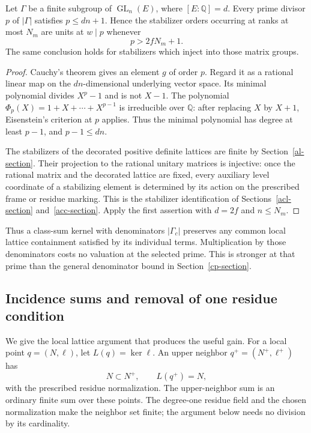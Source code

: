 \begin{lemma}\label{cv-stabilizer-unit}
Let $\Gamma$ be a finite subgroup of $\operatorname{GL}_n(E)$, where
$[E:\mathbb Q]=d$.  Every prime divisor $p$ of $|\Gamma|$ satisfies
$p\le dn+1$.  Hence the stabilizer orders occurring at ranks at
most $N_m$ are units at $w\mid p$ whenever
\[
                              p>2fN_m+1.
 \tag{CV14}
\]
The same conclusion holds for stabilizers which inject into those
matrix groups.
\end{lemma}
\begin{proof}
Cauchy's theorem gives an element $g$ of order $p$.  Regard it as
a rational linear map on the $dn$-dimensional underlying vector
space.  Its minimal polynomial divides $X^p-1$ and is not $X-1$.
The polynomial $\Phi_p(X)=1+X+\cdots+X^{p-1}$ is irreducible over
$\mathbb Q$: after replacing $X$ by $X+1$, Eisenstein's criterion
at $p$ applies.  Thus the minimal polynomial has degree at least
$p-1$, and $p-1\le dn$.

The stabilizers of the decorated positive definite lattices are
finite by Section~\ref{al-section}.  Their projection to the rational
unitary matrices is injective: once the rational matrix and the
decorated lattice are fixed, every auxiliary level coordinate of a
stabilizing element is determined by its action on the prescribed
frame or residue marking.  This is the stabilizer identification of
Sections~\ref{acl-section} and~\ref{acc-section}.  Apply the first
assertion with $d=2f$ and $n\le N_m$.
\end{proof}

Thus a class-sum kernel with denominators $|\Gamma_c|$ preserves
any common local lattice containment satisfied by its individual
terms.  Multiplication by those denominators costs no valuation at
the selected prime.  This is stronger at that prime than the general
denominator bound in Section~\ref{cp-section}.

\subsection{Incidence sums and removal of one residue condition}

We give the local lattice argument that produces the useful gain.
For a local point $q=(N,\ell)$, let $L(q)=\ker\ell$.  An upper
neighbor $q^+=(N^+,\ell^+)$ has
\[
          N\subset N^+,\qquad L(q^+)=N,
 \tag{CV15}
\]
with the prescribed residue normalization.  The upper-neighbor
sum is an ordinary finite sum over these points.  The degree-one
residue field and the chosen normalization make the neighbor set
finite; the argument below needs no division by its cardinality.

